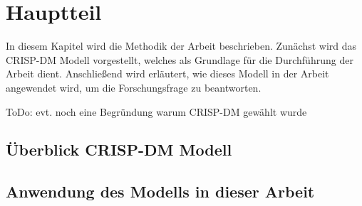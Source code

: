 \newpage

\section{Hauptteil} \label{Methodik}
In diesem Kapitel wird die Methodik der Arbeit beschrieben. Zunächst wird das CRISP-DM Modell vorgestellt, welches als Grundlage für die Durchführung der Arbeit dient. Anschließend wird erläutert, wie dieses Modell in der Arbeit angewendet wird, um die Forschungsfrage zu beantworten.

ToDo: evt. noch eine Begründung warum CRISP-DM gewählt wurde

\subsection{Überblick CRISP-DM Modell} \label{ueberblickcrispdm}


\subsection{Anwendung des Modells in dieser Arbeit} \label{anwendungdesmodellsinderarbeit}

